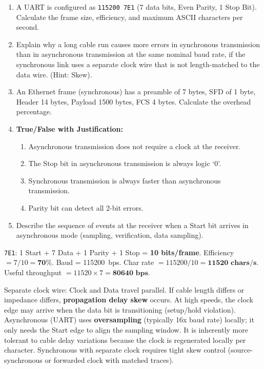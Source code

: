 \documentclass[11pt]{article}
\begin{document}
\begin{exercice}
\begin{enumerate}
    \item A UART is configured as \texttt{115200 7E1} (7 data bits, Even Parity, 1 Stop Bit). Calculate the frame size, efficiency, and maximum ASCII characters per second.
    \item Explain why a long cable run causes more errors in synchronous transmission than in asynchronous transmission at the same nominal baud rate, if the synchronous link uses a separate clock wire that is not length-matched to the data wire. (Hint: Skew).
    \item An Ethernet frame (synchronous) has a preamble of 7 bytes, SFD of 1 byte, Header 14 bytes, Payload 1500 bytes, FCS 4 bytes. Calculate the overhead percentage.
    \item \textbf{True/False with Justification:}
    \begin{enumerate}
        \item Asynchronous transmission does not require a clock at the receiver.
        \item The Stop bit in asynchronous transmission is always logic `0'.
        \item Synchronous transmission is always faster than asynchronous transmission.
        \item Parity bit can detect all 2-bit errors.
    \end{enumerate}
    \item Describe the sequence of events at the receiver when a Start bit arrives in asynchronous mode (sampling, verification, data sampling).
\end{enumerate}
\end{exercice}

\begin{corrige}[Exercise 1]
\texttt{7E1}: 1 Start + 7 Data + 1 Parity + 1 Stop = \textbf{10 bits/frame}.
Efficiency $= 7/10 = \mathbf{70\%}$.
Baud = \SI{115200}{bps}. Char rate $= 115200 / 10 = \mathbf{11520 \text{ chars/s}}$.
Useful throughput $= 11520 \times 7 = \mathbf{80640 \text{ bps}}$.
\end{corrige}

\begin{corrige}[Exercise 2]
Separate clock wire: Clock and Data travel parallel. If cable length differs or impedance differs, \textbf{propagation delay skew} occurs. At high speeds, the clock edge may arrive when the data bit is transitioning (setup/hold violation). Asynchronous (UART) uses \textbf{oversampling} (typically 16x baud rate) locally; it only needs the Start edge to align the sampling window. It is inherently more tolerant to cable delay variations because the clock is regenerated locally per character. Synchronous with separate clock requires tight skew control (source-synchronous or forwarded clock with matched traces).
\end{corrige}
\end{document}
